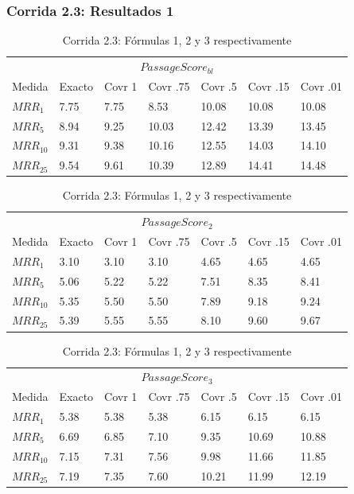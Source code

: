 \begin{frame}
\frametitle{Corrida 2.3: Resultados 1}
\begin{table}
\centering
\begin{center}

\begin{tabular}{|l | l | l | l | l | l | l |}

\multicolumn{7}{|c|}{$PassageScore_{bl}$}  \\ 
Medida & Exacto & Covr 1 & Covr .75 & Covr .5 & Covr .15 & Covr .01 \\ 
$MRR_{1}$ & 7.75 & 7.75 & 8.53 & 10.08 & 10.08 & 10.08  \\ 
$MRR_{5}$ & 8.94 & 9.25 & 10.03 & 12.42 & 13.39 & 13.45  \\ 
$MRR_{10}$ & 9.31 & 9.38 & 10.16 & 12.55 & 14.03 & 14.10  \\ 
$MRR_{25}$ & 9.54 & 9.61 & 10.39 & 12.89 & 14.41 & 14.48  \\ 
\end{tabular}

\medskip

\begin{tabular}{|l | l | l | l | l | l | l |}

\multicolumn{7}{|c|}{$PassageScore_2$}  \\ 
Medida & Exacto & Covr 1 & Covr .75 & Covr .5 & Covr .15 & Covr .01 \\ 
$MRR_{1}$ & 3.10 & 3.10 & 3.10 & 4.65 & 4.65 & 4.65  \\ 
$MRR_{5}$ & 5.06 & 5.22 & 5.22 & 7.51 & 8.35 & 8.41  \\ 
$MRR_{10}$ & 5.35 & 5.50 & 5.50 & 7.89 & 9.18 & 9.24  \\ 
$MRR_{25}$ & 5.39 & 5.55 & 5.55 & 8.10 & 9.60 & 9.67  \\ 
\end{tabular}


\medskip


\begin{tabular}{|l | l | l | l | l | l | l |}

\multicolumn{7}{|c|}{$PassageScore_3$}  \\ 
Medida & Exacto & Covr 1 & Covr .75 & Covr .5 & Covr .15 & Covr .01 \\ 
$MRR_{1}$ & 5.38 & 5.38 & 5.38 & 6.15 & 6.15 & 6.15  \\ 
$MRR_{5}$ & 6.69 & 6.85 & 7.10 & 9.35 & 10.69 & 10.88  \\ 
$MRR_{10}$ & 7.15 & 7.31 & 7.56 & 9.98 & 11.66 & 11.85  \\ 
$MRR_{25}$ & 7.19 & 7.35 & 7.60 & 10.21 & 11.99 & 12.19  \\ 
\end{tabular}


\caption{Corrida 2.3: Fórmulas 1, 2 y 3 respectivamente}
\label{table:2_3_40_getExactMRRWikiFactoid_getCovrMRRWikiFactoidq}
\end{center}
\end{table}

\end{frame}

